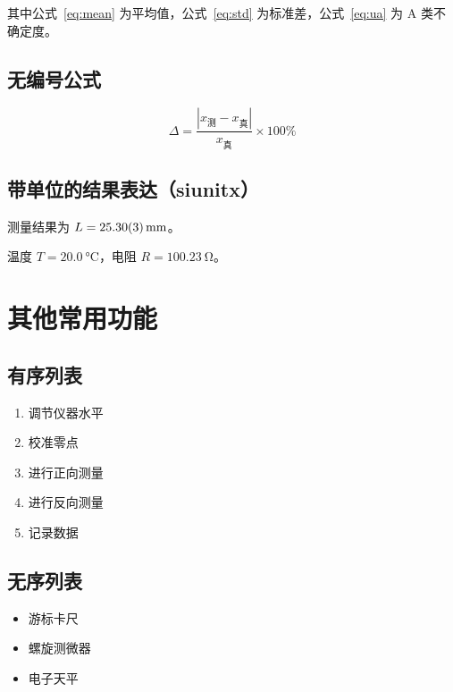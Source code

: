 \documentclass{Phyport}
\begin{document}
其中公式~\eqref{eq:mean} 为平均值，公式~\eqref{eq:std} 为标准差，公式~\eqref{eq:ua} 为 A 类不确定度。

\subsection{无编号公式}

\begin{equation*}
    \Delta = \frac{|x_{\text{测}} - x_{\text{真}}|}{x_{\text{真}}} \times 100\%
\end{equation*}

\subsection{带单位的结果表达（siunitx）}

测量结果为 $L = \SI{25.30 \pm 0.03}{mm}$。

温度 $T = \SI{20.0}{\degreeCelsius}$，电阻 $R = \SI{100.23}{\ohm}$。


\section{其他常用功能}

\subsection{有序列表}

\begin{enumerate}
    \item 调节仪器水平
    \item 校准零点
    \item 进行正向测量
    \item 进行反向测量
    \item 记录数据
\end{enumerate}

\subsection{无序列表}

\begin{itemize}
    \item 游标卡尺
    \item 螺旋测微器
    \item 电子天平
\end{itemize}
\end{document}
